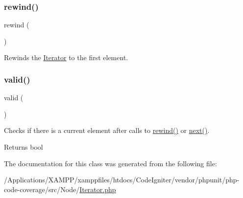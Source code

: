 \subsubsection{\texorpdfstring{rewind()}{rewind()}}
{\footnotesize\ttfamily rewind (\begin{DoxyParamCaption}{ }\end{DoxyParamCaption})}

Rewinds the \mbox{\hyperlink{class_sebastian_bergmann_1_1_code_coverage_1_1_node_1_1_iterator}{Iterator}} to the first element. \mbox{\label{class_sebastian_bergmann_1_1_code_coverage_1_1_node_1_1_iterator_abb9f0d6adf1eb9b3b55712056861a247}} 
\subsubsection{\texorpdfstring{valid()}{valid()}}
{\footnotesize\ttfamily valid (\begin{DoxyParamCaption}{ }\end{DoxyParamCaption})}

Checks if there is a current element after calls to \mbox{\hyperlink{class_sebastian_bergmann_1_1_code_coverage_1_1_node_1_1_iterator_ae619dcf2218c21549cb65d875bbc6c9c}{rewind()}} or \mbox{\hyperlink{class_sebastian_bergmann_1_1_code_coverage_1_1_node_1_1_iterator_acea62048bfee7b3cd80ed446c86fb78a}{next()}}.

\begin{DoxyReturn}{Returns}
bool 
\end{DoxyReturn}


The documentation for this class was generated from the following file\+:\begin{DoxyCompactItemize}
\item 
/\+Applications/\+X\+A\+M\+P\+P/xamppfiles/htdocs/\+Code\+Igniter/vendor/phpunit/php-\/code-\/coverage/src/\+Node/\mbox{\hyperlink{php-code-coverage_2src_2_node_2_iterator_8php}{Iterator.\+php}}\end{DoxyCompactItemize}
